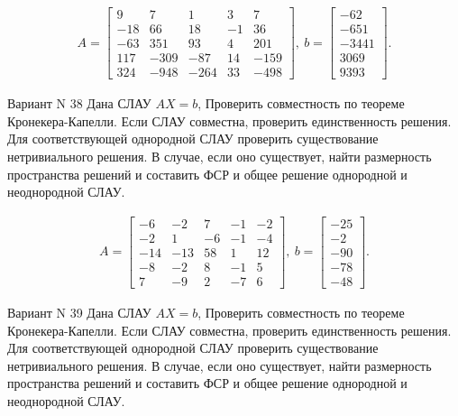 \documentclass[11pt]{report}
\begin{document}
\begin{align*}
 A = \left[\begin{matrix}9 & 7 & 1 & 3 & 7\\-18 & 66 & 18 & -1 & 36\\-63 & 351 & 93 & 4 & 201\\117 & -309 & -87 & 14 & -159\\324 & -948 & -264 & 33 & -498\end{matrix}\right],
\ b = \left[\begin{matrix}-62\\-651\\-3441\\3069\\9393\end{matrix}\right]. 
 \end{align*}

Вариант N 38
Дана СЛАУ $AX = b$,
Проверить совместность по теореме Кронекера-Капелли. Если СЛАУ совместна, проверить единственность решения.
Для соответствующей однородной СЛАУ проверить существование нетривиального решения. В случае, если оно существует,
найти размерность пространства решений и составить ФСР и общее решение однородной  и неоднородной СЛАУ.


\begin{align*}
 A = \left[\begin{matrix}-6 & -2 & 7 & -1 & -2\\-2 & 1 & -6 & -1 & -4\\-14 & -13 & 58 & 1 & 12\\-8 & -2 & 8 & -1 & 5\\7 & -9 & 2 & -7 & 6\end{matrix}\right],
\ b = \left[\begin{matrix}-25\\-2\\-90\\-78\\-48\end{matrix}\right]. 
 \end{align*}

Вариант N 39
Дана СЛАУ $AX = b$,
Проверить совместность по теореме Кронекера-Капелли. Если СЛАУ совместна, проверить единственность решения.
Для соответствующей однородной СЛАУ проверить существование нетривиального решения. В случае, если оно существует,
найти размерность пространства решений и составить ФСР и общее решение однородной  и неоднородной СЛАУ.
\end{document}
